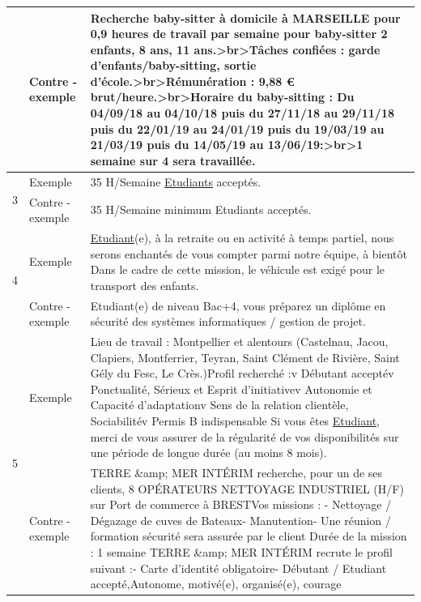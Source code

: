 \begin{longtable}{|p{}|p{}|p{}|}
                       & Contre - exemple & Recherche baby-sitter à domicile à MARSEILLE pour 0,9 heures de travail par semaine pour baby-sitter 2 enfants, 8 ans, 11 ans.\textgreater{}br\textgreater{}Tâches confiées : garde d'enfants/baby-sitting, sortie d'école.\textgreater{}br\textgreater{}Rémunération : 9,88 € brut/heure.\textgreater{}br\textgreater{}Horaire du baby-sitting : Du 04/09/18 au 04/10/18 puis du 27/11/18 au 29/11/18 puis du 22/01/19 au 24/01/19 puis du 19/03/19 au 21/03/19 puis du 14/05/19 au 13/06/19:\textgreater{}br\textgreater{}1 semaine sur 4 sera travaillée.    \\ \hline
    \multirow{2}{*}{3} & Exemple          & 35 H/Semaine \underline{Etudiants} acceptés.  \\ \cline{2-3}
                       & Contre - exemple & 35 H/Semaine minimum Etudiants acceptés. \\ \hline
    \multirow{2}{*}{4} & Exemple          & \underline{Etudiant}(e), à la retraite ou en activité à temps partiel, nous serons enchantés de vous compter parmi notre équipe, à bientôt Dans le cadre de cette mission, le véhicule est exigé pour le transport des enfants.  \\ \cline{2-3}
                       & Contre - exemple & Etudiant(e) de niveau Bac+4, vous préparez un diplôme en sécurité des systèmes informatiques / gestion de projet.  \\ \hline
    \multirow{2}{*}{5} & Exemple          & Lieu de travail : Montpellier et alentours (Castelnau, Jacou, Clapiers, Montferrier, Teyran, Saint Clément de Rivière, Saint Gély du Fesc, Le Crès.)Profil recherché :v  Débutant acceptév  Ponctualité, Sérieux et Esprit d'initiativev  Autonomie et Capacité d'adaptationv  Sens de la relation clientèle, Sociabilitév  Permis B indispensable Si vous êtes \underline{Etudiant}, merci de vous assurer de la régularité de vos disponibilités sur une période de longue durée (au moins 8 mois).    \\ \cline{2-3}
                       & Contre - exemple & TERRE \&amp; MER INTÉRIM recherche, pour un de ses clients, 8 OPÉRATEURS NETTOYAGE INDUSTRIEL (H/F) sur Port de commerce à BRESTVos missions : - Nettoyage / Dégazage de cuves de Bateaux- Manutention- Une réunion / formation sécurité sera assurée par le client Durée de la mission : 1 semaine   TERRE \&amp; MER INTÉRIM recrute le profil suivant :- Carte d'identité obligatoire- Débutant / Etudiant accepté,Autonome, motivé(e), organisé(e), courage  \\ \hline
\end{longtable}

